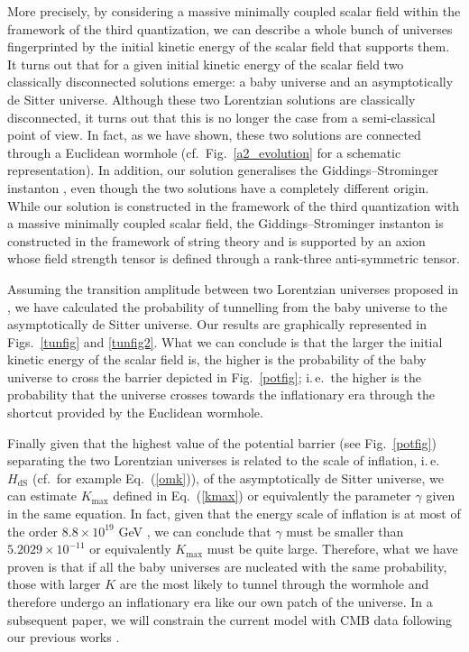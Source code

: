 \documentclass[aps,nofootinbib,prd,superscriptaddress,eqsecnum,showpacs,showkeys,preprintnumbers,altaffilletter]{revtex4}
\newcommand{\HdS}{H_\mathrm{dS}}
\begin{document}
More precisely, by considering a massive  minimally coupled scalar field within the framework of the third quantization, we can describe a whole bunch of universes fingerprinted by the initial kinetic energy of the scalar field that supports them. It turns out that for a given initial kinetic energy of the scalar field two classically disconnected solutions emerge: a baby universe and an asymptotically de Sitter universe. Although these two Lorentzian solutions are classically disconnected, it turns out that this is no longer the case from a semi-classical point of view. In fact, as we have shown, these two solutions are connected through a Euclidean wormhole (cf.~Fig.~\ref{a2_evolution} for a schematic representation).
In addition, our solution generalises the Giddings--Strominger instanton \cite{Giddings:1987cg}, even though the two solutions have a completely different origin. While our solution is constructed in the framework of the third quantization with a massive minimally coupled scalar field,  the Giddings--Strominger instanton is constructed in the framework of string theory and is supported by an axion whose field strength tensor is defined through a rank-three anti-symmetric tensor.

Assuming the transition amplitude between two Lorentzian universes proposed in \cite{Vilenkin:1984wp,Vilenkin}, we have calculated the probability of tunnelling from the baby universe to the asymptotically de Sitter universe. Our results are graphically represented in Figs.~\ref{tunfig} and \ref{tunfig2}. What we can conclude is that the larger the initial kinetic energy of the scalar field is, the higher is the probability of the baby universe to cross the barrier depicted in Fig.~\ref{potfig}; i.\,e.~the higher is the probability that the universe crosses towards the inflationary era through the shortcut provided by the Euclidean wormhole.

Finally given that the highest value of the potential barrier (see Fig.~\ref{potfig}) separating the two Lorentzian universes is related to the scale of inflation, i.\,e.~$\HdS$ (cf.~for example Eq.~(\ref{omk})), of the asymptotically de Sitter universe, we can estimate $K_{\max}$ defined in Eq.~(\ref{kmax}) or equivalently the parameter $\gamma$ given in the same equation. In fact, given that the energy scale of inflation is at most of the order $8.8\times 10^{19}$ GeV  \cite{Bartolo:2016ami}, we can conclude that 
$\gamma$  must be smaller than $5.2029\times10^{-11}$ or equivalently  $K_{\max}$  must be quite large. Therefore, what we have proven is that if all the baby universes are nucleated with the same probability, those with larger $K$ are the most likely  to tunnel through the wormhole and therefore undergo an inflationary era  
like our own patch of the universe. In a subsequent paper, we will constrain the current model with CMB data following our previous works \cite{mariam2011,mariam2013}. 
\end{document}
